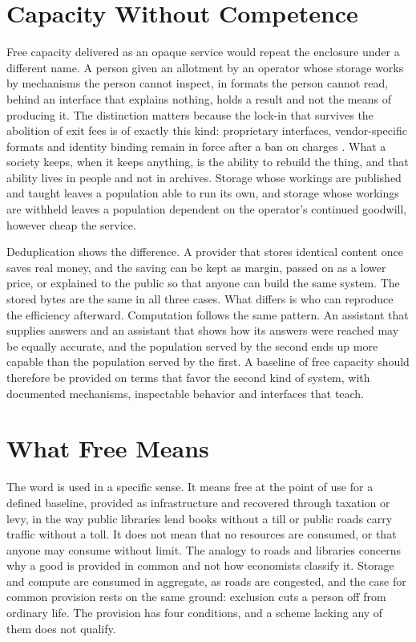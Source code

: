 \documentclass[11pt]{article}
\begin{document}
\section{Capacity Without Competence}

Free capacity delivered as an opaque service would repeat the enclosure under a different name. A person given an allotment by an operator whose storage works by mechanisms the person cannot inspect, in formats the person cannot read, behind an interface that explains nothing, holds a result and not the means of producing it. The distinction matters because the lock-in that survives the abolition of exit fees is of exactly this kind: proprietary interfaces, vendor-specific formats and identity binding remain in force after a ban on charges \cite{cloudmagazin}. What a society keeps, when it keeps anything, is the ability to rebuild the thing, and that ability lives in people and not in archives. Storage whose workings are published and taught leaves a population able to run its own, and storage whose workings are withheld leaves a population dependent on the operator's continued goodwill, however cheap the service.

Deduplication shows the difference. A provider that stores identical content once saves real money, and the saving can be kept as margin, passed on as a lower price, or explained to the public so that anyone can build the same system. The stored bytes are the same in all three cases. What differs is who can reproduce the efficiency afterward. Computation follows the same pattern. An assistant that supplies answers and an assistant that shows how its answers were reached may be equally accurate, and the population served by the second ends up more capable than the population served by the first. A baseline of free capacity should therefore be provided on terms that favor the second kind of system, with documented mechanisms, inspectable behavior and interfaces that teach.

\section{What Free Means}\label{sec:freemeans}

The word is used in a specific sense. It means free at the point of use for a defined baseline, provided as infrastructure and recovered through taxation or levy, in the way public libraries lend books without a till or public roads carry traffic without a toll. It does not mean that no resources are consumed, or that anyone may consume without limit. The analogy to roads and libraries concerns why a good is provided in common and not how economists classify it. Storage and compute are consumed in aggregate, as roads are congested, and the case for common provision rests on the same ground: exclusion cuts a person off from ordinary life. The provision has four conditions, and a scheme lacking any of them does not qualify.
\end{document}
